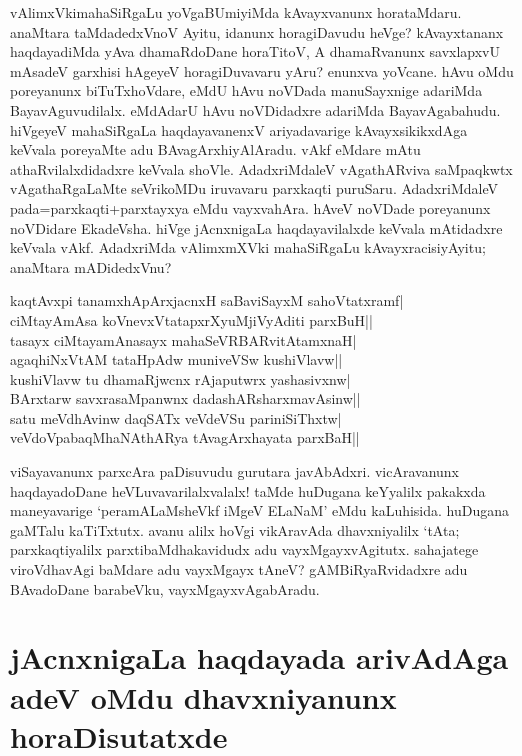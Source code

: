 vAlimxVkimahaSiRgaLu yoVgaBUmiyiMda kAvayxvanunx horataMdaru. anaMtara taMdadedxVnoV Ayitu, idanunx horagiDavudu heVge? kAvayxtananx haqdayadiMda yAva dhamaRdoDane horaTitoV, A dhamaRvanunx savxlapxvU mAsadeV garxhisi hAgeyeV horagiDuvavaru yAru? enunxva yoVcane. hAvu oMdu poreyanunx biTuTxhoVdare, eMdU hAvu noVDada manuSayxnige adariMda BayavAguvudilalx. eMdAdarU hAvu noVDidadxre adariMda BayavAgabahudu. hiVgeyeV mahaSiRgaLa haqdayavanenxV ariyadavarige kAvayxsikikxdAga keVvala poreyaMte adu BAvagArxhiyAlAradu. vAkf eMdare mAtu athaRvilalxdidadxre keVvala shoVle. AdadxriMdaleV vAgathARviva saMpaqkwtx vAgathaRgaLaMte\label{238} seVrikoMDu iruvavaru parxkaqti puruSaru. AdadxriMdaleV pada=parxkaqti+parxtayxya eMdu vayxvahAra. hAveV noVDade poreyanunx noVDidare EkadeVsha. hiVge jAcnxnigaLa haqdayavilalxde keVvala mAtidadxre keVvala vAkf. AdadxriMda vAlimxmXVki mahaSiRgaLu kAvayxracisiyAyitu; anaMtara mADidedxVnu? 

\begin{shloka}
kaqtAvx\s pi tanamxhApArxjacnxH saBaviSayxM sahoVtatxramf|\label{238a}\\
ciMtayAmAsa koV\s nevxVtatapxrXyuMjiVyAditi parxBuH||\\
tasayx ciMtayamAnasayx mahaSeVRBARvitAtamxnaH|\label{238c}\\
agaqhiNxVtAM tataHpAdw muniveVSw kushiVlavw||\\
kushiVlavw tu dhamaRjwcnx rAjaputwrx yashasivxnw|\label{238b}\\
BArxtarw savxrasaMpanwnx dadashARsharxmavAsinw||\\
satu meVdhAvinw daqSATx veVdeVSu pariniSiThxtw|\label{239}\\
veVdoVpabaqMhaNAthARya tAvagArxhayata parxBaH||
\end{shloka}

viSayavanunx parxcAra paDisuvudu gurutara javAbAdxri. vicAravanunx haqdayadoDane heVLuvavarilalxvalalx! taMde huDugana keYyalilx pakakxda maneyavarige `peramALaMsheVkf iMgeV ELaNaM' eMdu kaLuhisida. huDugana gaMTalu kaTiTxtutx. avanu alilx hoVgi vikAravAda dhavxniyalilx `tAta; parxkaqtiyalilx parxtibaMdhakavidudx adu vayxMgayxvAgitutx. sahajatege viroVdhavAgi baMdare adu vayxMgayx tAneV? gAMBiRyaRvidadxre adu BAvadoDane barabeVku, vayxMgayxvAgabAradu.

\section*{jAcnxnigaLa haqdayada arivAdAga adeV oMdu dhavxniyanunx  horaDisutatxde}


